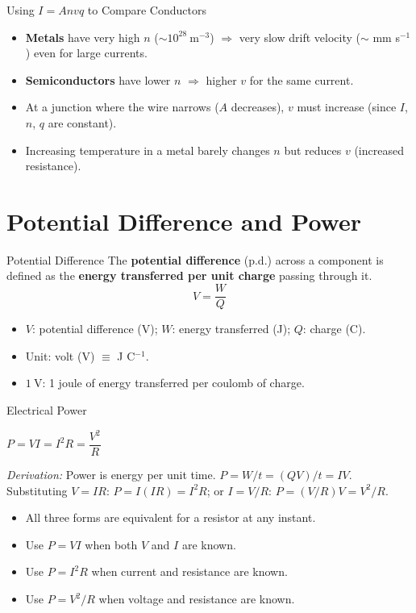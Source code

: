   \begin{keybox}{Using \texorpdfstring{$I = Anvq$}{I=Anvq} to Compare Conductors}
\begin{itemize}[itemsep=2pt]
  \item \textbf{Metals} have very high $n$ ($\sim 10^{28}\ \text{m}^{-3}$) $\Rightarrow$ very slow drift velocity ($\sim$ mm s$^{-1}$) even for large currents.
  \item \textbf{Semiconductors} have lower $n$ $\Rightarrow$ higher $v$ for the same current.
  \item At a junction where the wire narrows ($A$ decreases), $v$ must increase (since $I$, $n$, $q$ are constant).
  \item Increasing temperature in a metal barely changes $n$ but reduces $v$ (increased resistance).
\end{itemize}
\end{keybox}

\section{Potential Difference and Power}

\begin{definitionbox}{Potential Difference}
The \textbf{potential difference} (p.d.) across a component is defined as the \textbf{energy transferred per unit charge} passing through it.
$$V = \frac{W}{Q}$$
\begin{itemize}[itemsep=2pt]
  \item $V$: potential difference (V); \quad $W$: energy transferred (J); \quad $Q$: charge (C).
  \item Unit: volt (V) $\equiv$ J C$^{-1}$.
  \item $1\ \text{V}$: 1 joule of energy transferred per coulomb of charge.
\end{itemize}
\end{definitionbox}

\pagebreak

\begin{formulabox}{Electrical Power}
\begin{center}
\Large $P = VI = I^2R = \dfrac{V^2}{R}$
\end{center}
\vspace{0.3em}
\textit{Derivation:} Power is energy per unit time. $P = W/t = (QV)/t = IV$.
Substituting $V = IR$: $P = I(IR) = I^2R$; or $I = V/R$: $P = (V/R)V = V^2/R$.
\begin{itemize}[itemsep=2pt]
  \item All three forms are equivalent for a resistor at any instant.
  \item Use $P = VI$ when both $V$ and $I$ are known.
  \item Use $P = I^2R$ when current and resistance are known.
  \item Use $P = V^2/R$ when voltage and resistance are known.
\end{itemize}
\end{formulabox}

